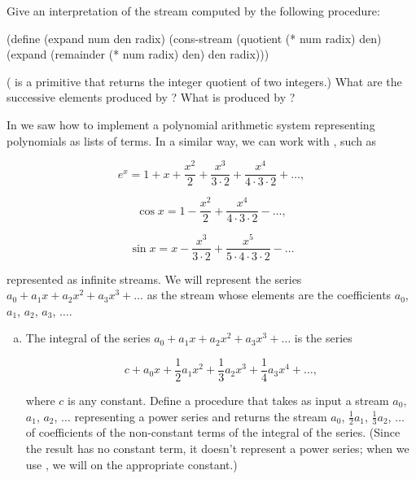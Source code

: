 \begin{exerciseGroup}
\label{Exercise 3.58}
 Give an interpretation of the
stream computed by the following procedure:

\begin{codeBlock}
(define (expand num den radix)
  (cons-stream
   (quotient (* num radix) den)
   (expand (remainder (* num radix) den) den radix)))
\end{codeBlock}

( is a primitive that returns the integer quotient of two
integers.)  What are the successive elements produced by ?  What is produced by ?

\label{Exercise 3.59}
 In  we saw how
to implement a polynomial arithmetic system representing polynomials as lists
of terms.  In a similar way, we can work with , such as

$$
e^x = 1 + x + \displaystyle\frac{x^2}{2} + \displaystyle\frac{x^3}{3 \cdot 2} + \displaystyle\frac{x^4}{4 \cdot 3 \cdot 2} + \dots,
$$


$$
\cos x = 1 - \displaystyle\frac{x^2}{2} + \displaystyle\frac{x^4}{4 \cdot 3 \cdot 2} - \dots,
$$


$$
\sin x = x - \displaystyle\frac{x^3}{3 \cdot 2} + \displaystyle\frac{x^5}{5 \cdot 4 \cdot 3 \cdot 2} - \dots
$$

\noindent
represented as infinite streams.  We will represent the series \( a_0 +
a_1 x + a_2 x^2 + a_3 x^3 + \dots \) as the stream whose
elements are the coefficients \( a_0 \), \( a_1 \), \( a_2 \), \( a_3 \), \( \dots \).

\begin{enumerate}[a.]

\item
The integral of the series \( a_0 + a_1 x + a_2 x^2 + a_3 x^3 + \dots \) is the series

$$ c + a_0 x + \frac{1}{2} a_1 x^2 + \frac{1}{3} a_2 x^3 + \frac{1}{4} a_3 x^4 + \dots, $$

\noindent
where \( c \) is any constant.  Define a procedure  that
takes as input a stream \( a_0 \), \( a_1 \), \( a_2 \), \( \dots \) representing a power
series and returns the stream \( a_0 \), \( \frac{1}{2}a_1 \), \( \frac{1}{3}a_2 \), \( \dots \) of
coefficients of the non-constant terms of the integral of the series.  (Since
the result has no constant term, it doesn't represent a power series; when we
use , we will  on the appropriate constant.)


\end{enumerate}
\end{exerciseGroup}
